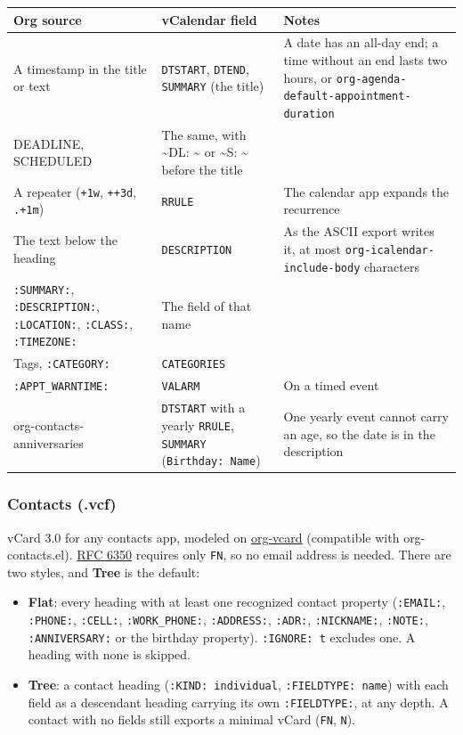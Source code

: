 \documentclass[11pt]{article}
\begin{document}
\begin{center}
\begin{tabular}{lll}
Org source & vCalendar field & Notes\\[0pt]
\hline
A timestamp in the title or text & \texttt{DTSTART}, \texttt{DTEND}, \texttt{SUMMARY} (the title) & A date has an all-day end; a time without an end lasts two hours, or \texttt{org-agenda-default-appointment-duration}\\[0pt]
DEADLINE, SCHEDULED & The same, with \textasciitilde{}DL: \textasciitilde{} or \textasciitilde{}S: \textasciitilde{} before the title & \\[0pt]
A repeater (\texttt{+1w}, \texttt{++3d}, \texttt{.+1m}) & \texttt{RRULE} & The calendar app expands the recurrence\\[0pt]
The text below the heading & \texttt{DESCRIPTION} & As the ASCII export writes it, at most \texttt{org-icalendar-include-body} characters\\[0pt]
\texttt{:SUMMARY:}, \texttt{:DESCRIPTION:}, \texttt{:LOCATION:}, \texttt{:CLASS:}, \texttt{:TIMEZONE:} & The field of that name & \\[0pt]
Tags, \texttt{:CATEGORY:} & \texttt{CATEGORIES} & \\[0pt]
\texttt{:APPT\_WARNTIME:} & \texttt{VALARM} & On a timed event\\[0pt]
org-contacts-anniversaries & \texttt{DTSTART} with a yearly \texttt{RRULE}, \texttt{SUMMARY} (\texttt{Birthday: Name}) & One yearly event cannot carry an age, so the date is in the description\\[0pt]
\end{tabular}
\end{center}

\subsubsection{Contacts (.vcf)}
\label{sec:orgb74c145}

vCard 3.0 for any contacts app, modeled on \href{https://github.com/pinoaffe/org-vcard}{org-vcard} (compatible with org-contacts.el). \href{https://www.rfc-editor.org/rfc/rfc6350}{RFC 6350} requires only \texttt{FN}, so no email address is needed. There are two styles, and \textbf{Tree} is the default:

\begin{itemize}
\item \textbf{Flat}: every heading with at least one recognized contact property (\texttt{:EMAIL:}, \texttt{:PHONE:}, \texttt{:CELL:}, \texttt{:WORK\_PHONE:}, \texttt{:ADDRESS:}, \texttt{:ADR:}, \texttt{:NICKNAME:}, \texttt{:NOTE:}, \texttt{:ANNIVERSARY:} or the birthday property). \texttt{:IGNORE: t} excludes one. A heading with none is skipped.
\item \textbf{Tree}: a contact heading (\texttt{:KIND: individual}, \texttt{:FIELDTYPE: name}) with each field as a descendant heading carrying its own \texttt{:FIELDTYPE:}, at any depth. A contact with no fields still exports a minimal vCard (\texttt{FN}, \texttt{N}).
\end{itemize}
\end{document}
